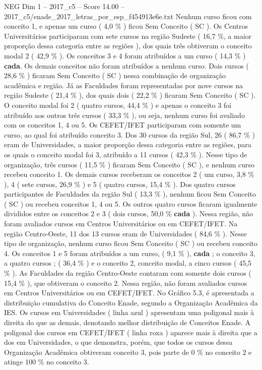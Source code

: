 \begin{textsample}{NEG Dim 1 – 2017\_c5 – Score 14.00 – 2017\_c5/enade\_2017\_letras\_por\_esp\_f454913e6e.txt}
Nenhum curso ficou com conceito 1, e apenas um curso ( 4,0 \% ) ficou Sem Conceito ( SC ).
Os Centros Universitários participaram com sete cursos na região Sudeste ( 16,7 \%, a maior proporção dessa categoria entre as regiões ), dos quais três obtiveram o conceito modal 2 ( 42,9 \% ).
Os conceitos 3 e 4 foram atribuídos a um curso ( 14,3 \% ) \textbf{cada}.
Os demais conceitos não foram atribuídos a nenhum curso.
Dois cursos ( 28,6 \% ) ficaram Sem Conceito ( SC ) nessa combinação de organização acadêmica e região.
Já as Faculdades foram representadas por nove cursos na região Sudeste ( 21,4 \% ), dos quais dois ( 22,2 \% ) ficaram Sem Conceito ( SC ).
O conceito modal foi 2 ( quatro cursos, 44,4 \% ) e apenas o conceito 3 foi atribuído aos outros três cursos ( 33,3 \% ), ou seja, nenhum curso foi avaliado com os conceitos 1, 4 ou 5.
Os CEFET/IFET participaram com somente um curso, ao qual foi atribuído conceito 3.
Dos 30 cursos da região Sul, 26 ( 86,7 \% ) eram de Universidades, a maior proporção dessa categoria entre as regiões, para os quais o conceito modal foi 3, atribuído a 11 cursos ( 42,3 \% ).
Nesse tipo de organização, três cursos ( 11,5 \% ) ficaram Sem Conceito ( SC ), e nenhum curso recebeu conceito 1.
Os demais cursos receberam os conceitos 2 ( um curso, 3,8 \% ), 4 ( sete cursos, 26,9 \% ) e 5 ( quatro cursos, 15,4 \% ).
Dos quatro cursos participantes de Faculdades da região Sul ( 13,3 \% ), nenhum ficou Sem Conceito ( SC ) ou recebeu conceitos 1, 4 ou 5.
Os outros quatro cursos ficaram igualmente divididos entre os conceitos 2 e 3 ( dois cursos, 50,0 \% \textbf{cada} ).
Nessa região, não foram avaliados cursos em Centros Universitários ou em CEFET/IFET.
Na região Centro-Oeste, 11 dos 13 cursos eram de Universidades ( 84,6 \% ).
Nesse tipo de organização, nenhum curso ficou Sem Conceito ( SC ) ou recebeu conceito 4.
Os conceitos 1 e 5 foram atribuídos a um curso, ( 9,1 \% ), \textbf{cada} ; o conceito 3, a quatro cursos ; ( 36,4 \% ) e o conceito 2, conceito modal, a cinco cursos ( 45,5 \% ).
As Faculdades da região Centro-Oeste contaram com somente dois cursos ( 15,4 \% ), que obtiveram o conceito 2.
Nessa região, não foram avaliados cursos em Centros Universitários ou em CEFET/IFET.
No Gráfico 5.3, é apresentada a distribuição cumulativa do Conceito Enade, segundo a Organização Acadêmica da IES.
Os cursos em Universidades ( linha azul ) apresentam uma poligonal mais à direita do que as demais, denotando melhor distribuição de Conceitos Enade.
A poligonal dos cursos em CEFET/IFET ( linha roxa ) aparece mais à direita que a dos em Universidades, o que demonstra, porém, que todos os cursos dessa Organização Acadêmica obtiveram conceito 3, pois parte de 0 \% no conceito 2 e atinge 100 \% no conceito 3.

\end{textsample}
